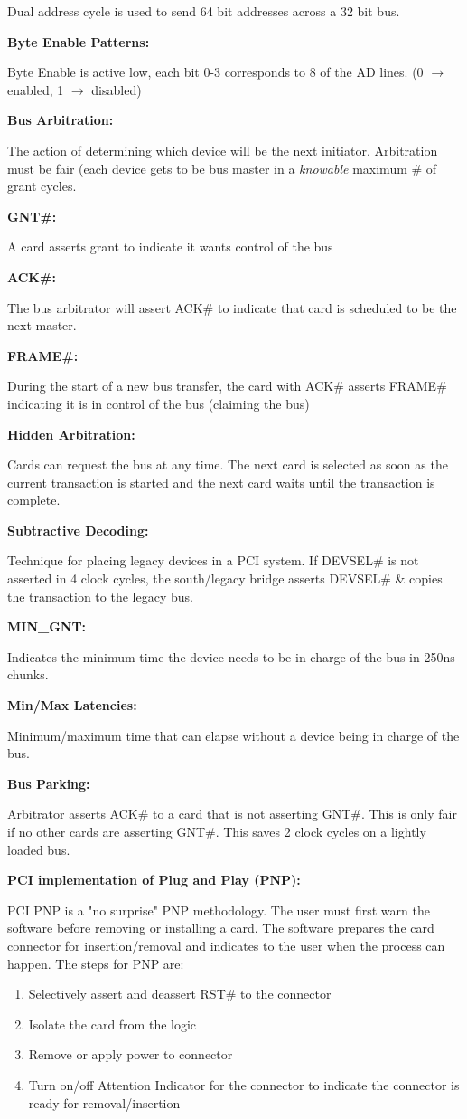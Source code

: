 \documentclass{article}
\newcommand{\ti}[1]{\hangindent=0.25in\noindent\begin{footnotesize}\textbf{#1:}\end{footnotesize}}
\newcommand{\hi}{\setlength\parindent{0.25in}\indent\hangindent=0.5in}
\newcommand{\ra}{$\rightarrow$ }
\begin{document}
\begin{footnotesize}
\begin{multicols*}{2}
		\hi Dual address cycle is used to send 64 bit addresses across a 32 bit bus.		
		
		\hi\ti{Byte Enable Patterns} Byte Enable is active low, each bit 0-3 corresponds to 8 of the AD lines. (0 \ra enabled, 1 \ra disabled)
		
	\ti{Bus Arbitration} The action of determining which device will be the next initiator. Arbitration must be fair (each device gets to be bus master in a \textit{knowable} maximum \# of grant cycles.
	
		\hi\ti{GNT\#} A card asserts grant to indicate it wants control of the bus
		
		\hi\ti{ACK\#} The bus arbitrator will assert ACK\# to indicate that card is scheduled to be the next master.
		
		\hi\ti{FRAME\#} During the start of a new bus transfer, the card with ACK\# asserts FRAME\# indicating it is in control of the bus (claiming the bus)
	
	\ti{Hidden Arbitration} Cards can request the bus at any time. The next card is selected as soon as the current transaction is started and the next card waits until the transaction is complete.
	
	\ti{Subtractive Decoding} Technique for placing legacy devices in a PCI system. If DEVSEL\# is not asserted in 4 clock cycles, the south/legacy bridge asserts DEVSEL\# \& copies the transaction to the legacy bus.
	
	\ti{MIN\_GNT} Indicates the minimum time the device needs to be in charge of the bus in 250ns chunks.
	
	\ti{Min/Max Latencies} Minimum/maximum time that can elapse without a device being in charge of the bus.
	
	\ti{Bus Parking} Arbitrator asserts ACK\# to a card that is not asserting GNT\#. This is only fair if no other cards are asserting GNT\#. This saves 2 clock cycles on a lightly loaded bus.
	
	\ti{PCI implementation of Plug and Play (PNP)} PCI PNP is a "no surprise" PNP methodology. The user must first warn the software before removing or installing a card. The software prepares the card connector for insertion/removal and indicates to the user when the process can happen. The steps for PNP are:
	
	\begin{enumerate}
	\item Selectively assert and deassert RST\# to the connector
	\item Isolate the card from the logic
	\item Remove or apply power to connector
	\item Turn on/off Attention Indicator for the connector to indicate the connector is ready for removal/insertion
	\end{enumerate}
	
	\end{multicols*}
	\end{footnotesize}
\end{document}
